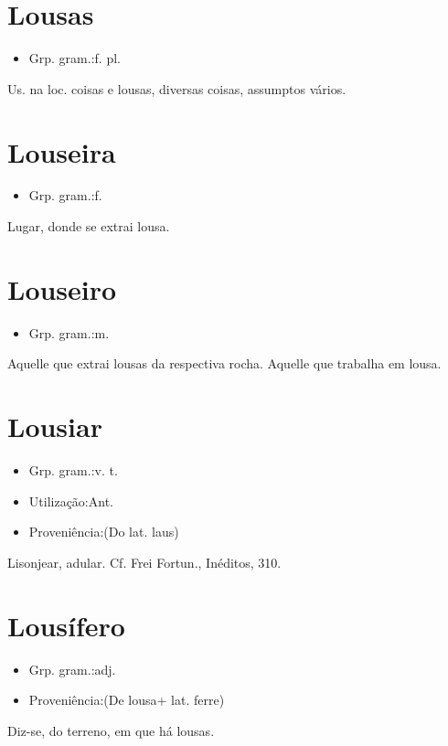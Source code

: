 \section{Lousas}
\begin{itemize}
\item {Grp. gram.:f. pl.}
\end{itemize}
Us. na loc. \textunderscore coisas e lousas\textunderscore , diversas coisas, assumptos vários.
\section{Louseira}
\begin{itemize}
\item {Grp. gram.:f.}
\end{itemize}
Lugar, donde se extrai lousa.
\section{Louseiro}
\begin{itemize}
\item {Grp. gram.:m.}
\end{itemize}
Aquelle que extrai lousas da respectiva rocha.
Aquelle que trabalha em lousa.
\section{Lousiar}
\begin{itemize}
\item {Grp. gram.:v. t.}
\end{itemize}
\begin{itemize}
\item {Utilização:Ant.}
\end{itemize}
\begin{itemize}
\item {Proveniência:(Do lat. \textunderscore laus\textunderscore )}
\end{itemize}
Lisonjear, adular. Cf. Frei Fortun., \textunderscore Inéditos\textunderscore , 310.
\section{Lousífero}
\begin{itemize}
\item {Grp. gram.:adj.}
\end{itemize}
\begin{itemize}
\item {Proveniência:(De \textunderscore lousa\textunderscore  + lat. \textunderscore ferre\textunderscore )}
\end{itemize}
Diz-se, do terreno, em que há lousas.
